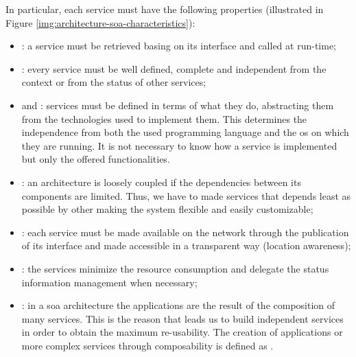 In particular, each service must have the following properties (illustrated in Figure 
\ref{img:architecture-soa-characteristics}):

\begin{itemize}
	\item{: a service must be retrieved basing on its interface and
		called at run-time;}
	\item{: every service must be well defined, complete and independent
		from the context or from the status of other services;}
	\item{ and : services must
		be defined in terms of what they do, abstracting them from the technologies used to implement
		them. This determines the independence from both the used programming language and the \acs{os}
		on which they are running. It is not necessary to know how a service is implemented but only
		the offered functionalities.}
	\item{: an architecture is loosely coupled if the dependencies
		between its components are limited. Thus, we have to made services that depends least as possible
		by other making the system flexible and easily customizable;}
	\item{: each service must be made available on the network through
		the publication of its interface and made accessible in a transparent way (location awareness);}
	\item{: the services minimize the resource consumption and delegate
		the status information management when necessary;}
	\item{: in a \ac{soa} architecture the applications are the result of
		the composition of many services. This is the reason that leads us to build independent services
		in order to obtain the maximum re-usability. The creation of applications or more complex
		services through composability is defined as .}
\end{itemize}

